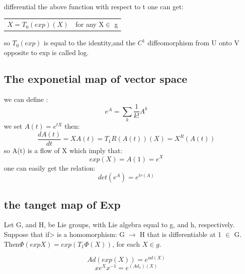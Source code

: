 differential the above function with respect to t one can get:
\begin{center}
\begin{tabular}{cc}
$X=T_0(exp)(X)$&for any X$\in$ g\\
\end{tabular}
\end{center}
so $T_0(exp)$ is equal to the identity,and  the $C^1$ diffeomorphism from U onto V opposite to exp is called log.\par
\subsection{The exponetial map of vector space}
we can define :
\[e^A=\sum_k\frac{1}{k!}A^k\]
we set $A(t)=e^{tX}$ then:
\[\frac{dA(t)}{dt}=XA(t)=T_1R(A(t))(X)=X^R(A(t))\]
so A(t) is a flow of X which imply that:
\[exp(X)=A(1)=e^X\]
one can easily get the relation:
\[det(e^A)=e^{tr(A)}\]
\subsection{the tanget map of Exp}
\begin{lemma}
Let G, and H, be Lie groups, with Lie algebra equal to g, and h, respectively. Suppose that if> is a homomorphism: G $\rightarrow$ H that is differentiable at 1 $\in$ G. Then$\Phi(expX) = exp(T_1\Phi(X))$, for each $X\in g$.
\end{lemma}
\begin{theorem}
\[Ad(exp(X))=e^{ad(X)}\]
\[xe^Xx^{-1}=e^{(Ad_x)(X)}\]
\end{theorem}

